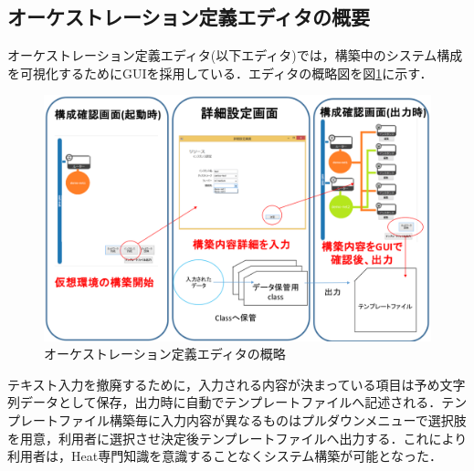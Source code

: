 \documentclass[a4j]{jarticle}
\begin{document}
\begin{Abstract}
 \subsection{オーケストレーション定義エディタの概要}
 オーケストレーション定義エディタ(以下エディタ)では，構築中のシステム構成を可視化するためにGUIを採用している．エディタの概略図を図\ref{graf:1}に示す．
 \begin{figure}[H]
 	\begin{center}
 		\vspace{-2.87mm}
 		\includegraphics[scale=0.26]{Document/GUIEditorOverview.eps}
 		\caption{オーケストレーション定義エディタの概略}
 		\label{graf:1}
 	\end{center}
 \end{figure}
 \vspace{-4mm}
 
 テキスト入力を撤廃するために，入力される内容が決まっている項目は予め文字列データとして保存，出力時に自動でテンプレートファイルへ記述される．テンプレートファイル構築毎に入力内容が異なるものはプルダウンメニューで選択肢を用意，利用者に選択させ決定後テンプレートファイルへ出力する．これにより利用者は，Heat専門知識を意識することなくシステム構築が可能となった．


\end{Abstract}
\end{document}
